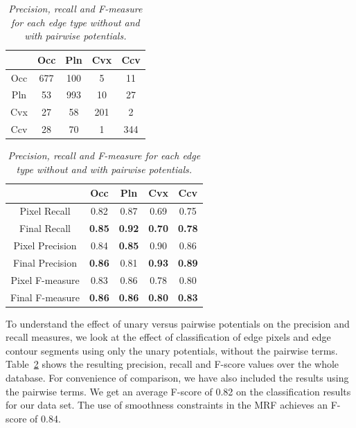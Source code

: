 \begin{table}[h]
\parbox{.4\linewidth}{
\centering
\caption{\it Confusion matrix across the four classes.  The numbers given
are the average number of edge pixels per image.}
\label{table:confusion}
       \begin{tabular}{|c||c|c|c|c|}
       \hline
        & Occ & Pln & Cvx & Ccv \\ 
        \hline 
        \hline
	Occ & 677 & 100 & 5 & 11 \\ \hline 
	Pln & 53 & 993 & 10 & 27 \\ \hline 
	Cvx & 27 & 58 & 201 & 2 \\ \hline 
	Ccv & 28 & 70 & 1 & 344 \\ \hline 
\end{tabular}
}
\hfill
\parbox{.55\linewidth}{
\centering
\caption{\it Precision, recall and F-measure for each edge type without and with
pairwise potentials.}
\label{table:compare}
       \begin{tabular}{|c||c|c|c|c|}
       \hline
        & Occ & Pln & Cvx & Ccv \\ 
        \hline 
        \hline
	Pixel Recall & 0.82 & 0.87 & 0.69 & 0.75 \\ \hline 
	Final Recall & {\bf 0.85} & {\bf 0.92} & {\bf 0.70} & {\bf 0.78} \\ \hline \hline
	Pixel Precision & 0.84 & {\bf 0.85} & 0.90 &  0.86 \\ \hline 
	Final Precision & {\bf 0.86} &  0.81 & {\bf 0.93} & {\bf 0.89} \\ \hline \hline
	Pixel F-measure & 0.83 & 0.86 & 0.78 & 0.80 \\ \hline 
	Final F-measure & {\bf 0.86} & {\bf 0.86} & {\bf 0.80} & {\bf 0.83} \\ \hline 
\end{tabular}
}
\end{table}

To understand the effect of unary versus pairwise potentials on the precision and recall measures, we
look at the effect of classification of edge pixels and edge contour segments using only the unary potentials,
without the pairwise terms. Table~\ref{table:compare} shows the resulting precision, recall and F-score
values over the whole database. For convenience of comparison, we have also included the results using
the pairwise terms. We get an average F-score of 0.82 on the classification results for our 
data set. The use of smoothness constraints in the MRF achieves an F-score of 0.84.

